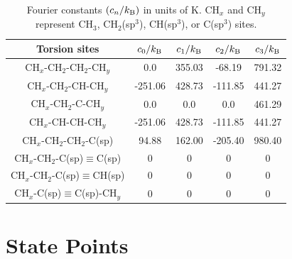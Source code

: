 \documentclass[journal=jctc,manuscript=article]{achemso}
\begin{document}
    \begin{table}[h!]
		\caption{Fourier constants $(c_n/k_{\rm B})$ in units of K. CH$_x$ and CH$_y$ represent CH$_3$, CH$_2$(sp$^3$), CH(sp$^3$), or C(sp$^3$) sites.} \label{tab:torsions}
		\begin{center}
			\begin{tabular}{|c|c|c|c|c|}
				\hline
				Torsion sites & $c_0/k_{\rm B}$ & $c_1/k_{\rm B}$ & $c_2/k_{\rm B}$ & $c_3/k_{\rm B}$ \\ \hline
				CH$_x$-CH$_2$-CH$_2$-CH$_y$ & 0.0 & 355.03 & -68.19 & 791.32 \\ 
				CH$_x$-CH$_2$-CH-CH$_y$ & -251.06 & 428.73 & -111.85 & 441.27 \\
				CH$_x$-CH$_2$-C-CH$_y$ & 0.0 & 0.0 & 0.0 & 461.29 \\
				CH$_x$-CH-CH-CH$_y$ & -251.06 & 428.73 & -111.85 & 441.27 \\
				CH$_x$-CH$_2$-CH$_2$-C(sp) & 94.88 & 162.00 & -205.40 & 980.40 \\
				CH$_x$-CH$_2$-C(sp)$\equiv$C(sp) & 0 & 0 & 0 & 0 \\
				CH$_x$-CH$_2$-C(sp)$\equiv$CH(sp) & 0 & 0 & 0 & 0 \\
				CH$_x$-C(sp)$\equiv$C(sp)-CH$_y$ & 0 & 0 & 0 & 0 \\
				\hline
			\end{tabular}
		\end{center} 
	\end{table}




\section{State Points} \label{SI sec: State Points}
\end{document}

